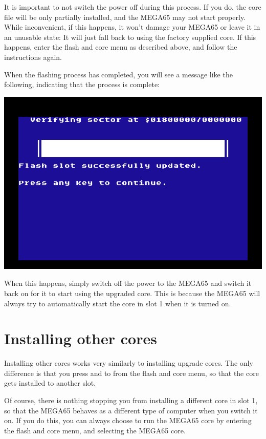 It is important to not switch the power off during this process. If you do, the core file will be
only partially installed, and the MEGA65 may not start properly.
While
inconvenient, if this happens, it won't damage your MEGA65 or leave it
in an unusable state: It will just fall back to using the factory
supplied core.
If this happens, enter the flash and core
menu as described above, and follow the instructions again.

When the flashing process has completed, you will see a message like the following, indicating that the process is complete:

\includegraphics[width=\linewidth]{images/ss-flashmenu-done.png}


When this happens, simply switch off the power to the MEGA65 and switch it back on for it to start using the
upgraded core.  This is because the MEGA65 will always try to automatically start the core in slot 1 when
it is turned on.

\section{Installing other cores}

Installing other cores works very similarly to installing upgrade cores. The only difference is that you
press  and  to  from the flash and core menu, so that the core
gets installed to another slot.

Of course, there is nothing stopping you from installing a different core
in slot 1, so that the MEGA65 behaves as a different type of computer when you switch it on.  If you do this,
you can always choose to run the MEGA65 core by entering the flash and core menu,  and selecting the MEGA65
core.

